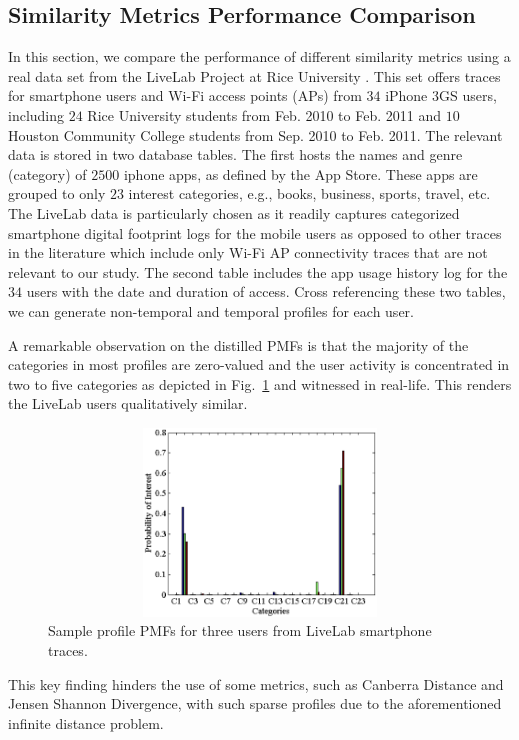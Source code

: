 \documentclass[12pt,epsf]{article}
\theoremstyle{definition}
\begin{document}
\subsection{Similarity Metrics Performance Comparison}
\vspace{-0.2 cm}
%
In this section, we compare the performance of different similarity
metrics using a real data set from the LiveLab Project at Rice University
\cite{data}. This set offers traces for smartphone users and 
Wi-Fi access points (APs) from $34$ iPhone 3GS users, including $24$ Rice
University students from Feb. 2010 to Feb. 2011 and $10$ Houston
Community College students from Sep. 2010 to Feb. 2011. The relevant data is
stored in two database tables. The first hosts the names and genre
(category) of $2500$ iphone apps, as defined by the App Store. These
apps are grouped to only $23$ interest categories, e.g., books, business,
sports, travel, etc. The LiveLab data is particularly chosen as it
readily captures categorized smartphone digital footprint logs for
the mobile users as opposed to other traces in the literature which
include only Wi-Fi AP connectivity traces that are not relevant to
our study. The second table includes the app usage history log for
the $34$ users with the date and duration of access. Cross referencing
these two tables, we can generate non-temporal and temporal profiles
for each user.

A remarkable observation on the distilled PMFs is that the majority
of the categories in most profiles are zero-valued and the user activity 
is concentrated in two to five categories as
depicted in Fig.~\ref{fig:SampleProfile} and witnessed in real-life.
This renders the LiveLab users \textquotedbl{}qualitatively\textquotedbl{} 
similar. 
\begin{figure}[!tp]
\centering
  \includegraphics[width=11.5cm,height=5cm]{User2.eps} 
  \caption{Sample profile PMFs for three users from LiveLab smartphone traces.} 
       \label{fig:SampleProfile}
\end{figure}
 This key finding hinders the use of some metrics, such as Canberra
Distance and Jensen Shannon Divergence, with such sparse profiles due to the 
aforementioned infinite distance problem. 
\end{document}
